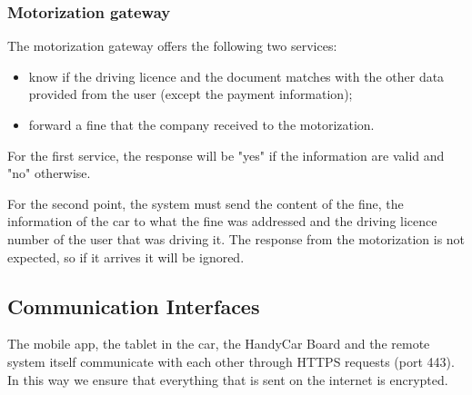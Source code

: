 \subsubsection{Motorization gateway}
The motorization gateway offers the following two services:
\begin{itemize}
\item know if the driving licence and the document matches with the other data provided from the user (except the payment information);
\item forward a fine that the company received to the motorization.
\end{itemize}

For the first service, the response will be "yes" if the information are valid and "no" otherwise.

For the second point, the system must send the content of the fine, the information of the car to what the fine was addressed and the driving licence number of the user that was driving it. The response from the motorization is not expected, so if it arrives it will be ignored.

\subsection{Communication Interfaces}
The mobile app, the tablet in the car, the HandyCar Board and the remote system itself communicate with each other through HTTPS requests (port 443). In this way we ensure that everything that is sent on the internet is encrypted.
